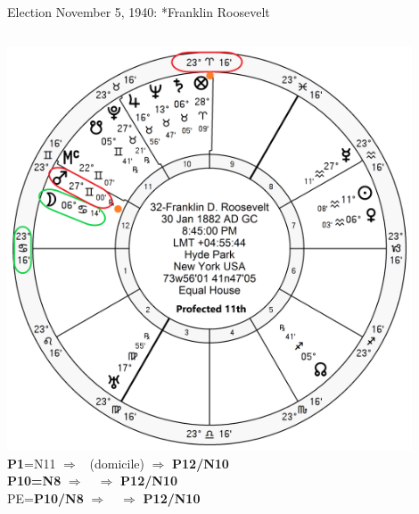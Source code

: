 \begin{frame}[t]{Election November 5, 1940: *Franklin Roosevelt}
\begin{columns}[T, onlytextwidth]
\vspace{-1em}
{\includegraphics[width=0.9\textwidth]{charts/FDR-Prof-11th.png}}
\textbf{\dgreen P1}=N11
	$\Rightarrow$ \Moon\, (domicile) $\Rightarrow$ \textbf{\dgreen P12/N10} \\
\textbf{\red P10=N8}
	$\Rightarrow$  \Mars\,\Retrograde\, $\Rightarrow$ \textbf{\dgreen P12/N10} \\
PE=\textbf{\red P10/N8}
	$\Rightarrow$  \Mars\,\Retrograde\, $\Rightarrow$   \textbf{\dgreen P12/N10}


\end{columns}
\end{frame}

